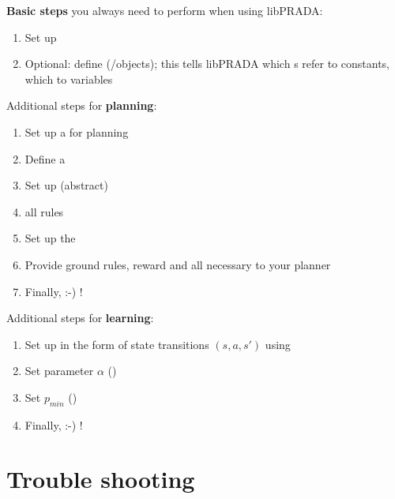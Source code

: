 \documentclass[10pt,twoside,twocolumn,fleqn]{article}
\begin{document}
\textbf{Basic steps} you always need to perform when using libPRADA:
\begin{enumerate}
\item Set up 
\item Optional: define  (/objects); this tells libPRADA
which s refer to constants, which to variables
\end{enumerate}

Additional steps for \textbf{planning}:
\begin{enumerate}
\item Set up a  for planning
\item Define a 
\item Set up (abstract) 
\item {} all rules
\item Set up the 
\item Provide ground rules, reward and all necessary  to
your planner
\item Finally,  :-) !
\end{enumerate}

Additional steps for \textbf{learning}:
\begin{enumerate}
\item Set up  in the form of state transitions $(s,a,s')$ using

\item Set  parameter $\alpha$ ()

\item Set  $p_{min}$ ()

\item Finally,  :-) !
\end{enumerate}





\section{Trouble shooting}
\end{document}
